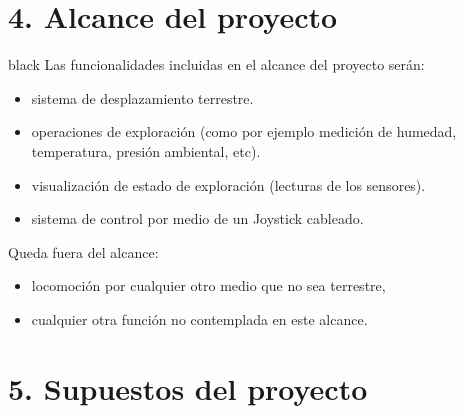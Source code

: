 \documentclass[
11pt, %
]{charter}
\begin{document}
\section{4. Alcance del proyecto}
\label{sec:alcance}

\begin{consigna}{black}
Las funcionalidades incluidas en el alcance del proyecto serán:
\begin{itemize}
	\item sistema de desplazamiento terrestre.
	\item operaciones de exploración (como por ejemplo medición de humedad, temperatura, presión ambiental, etc).
	\item visualización de estado de exploración (lecturas de los sensores).
	\item sistema de control por medio de un Joystick cableado.
\end{itemize}

Queda fuera del alcance:
\begin{itemize}
	\item locomoción por cualquier otro medio que no sea terrestre,
	\item cualquier otra función no contemplada en este alcance.
\end{itemize}
\end{consigna}


\section{5. Supuestos del proyecto}
\label{sec:supuestos}
\end{document}

